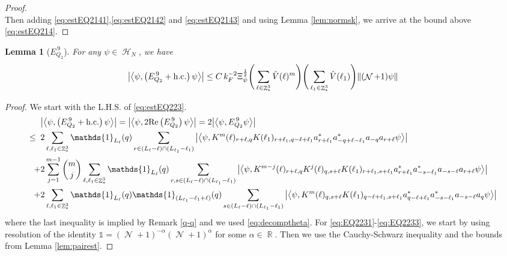 \documentclass[sn-mathphys, Numbered ,a4paper]{sn-jnl}%
\DeclareMathOperator{\R}{\mathbb{R}}
\DeclareMathOperator{\Z}{\mathbb{Z}}
\DeclareMathOperator{\HH}{\mathcal{H}}
\DeclareMathOperator{\NN}{\mathcal{N}}
\newcommand{\half}{\frac{1}{2}}
\newcommand{\eva}[1]{\left\langle #1 \right\rangle}
\theoremstyle{plain}
\newtheorem{lemma}[theorem]{Lemma}
\theoremstyle{definition}
\theoremstyle{remark}
\theoremstyle{plain}
\theoremstyle{definition}
\theoremstyle{remark}
\begin{document}
{\begin{proof}
\begin{equation}
		\end{equation}
		Then adding \eqref{eq:estEQ2141},\eqref{eq:estEQ2142} and \eqref{eq:estEQ2143} and using Lemma \ref{lem:normsk}, we arrive at the bound above \eqref{eq:estEQ214}.
	\end{proof}
	\begin{lemma}[$E_{Q_2}^{\,9}$]\label{lem:EQ223}
		For any $\psi \in \HH_N$, we have
		\begin{align}
			\abs{\eva{\psi,\left(E^{\,9}_{Q_2}+\mathrm{h.c.}\right) \psi }}
			\leq  C\, k_{F}^{-2} \Xi_{\psi}^{\half} \Bigg(\sum\limits_{\ell \in \Z^3_*} \hat{V}(\ell)^m \Bigg) \Bigg( \sum\limits_{\ell_1 \in \Z^3_*}\hat{V}(\ell_1) \Bigg)  \norm { (\NN+1) \psi } \label{eq:estEQ223}
		\end{align}
	\end{lemma}
	\begin{proof}
		We start with the L.H.S. of \eqref{eq:estEQ223}.
		\begin{align}
			&\abs{\eva{\psi,\left(E^{\,9}_{Q_2}+\mathrm{h.c.}\right) \psi }} = \abs{\eva{\psi,2\mathrm{Re}\left(E^{\,9}_{Q_2}\right) \psi }} = 2\abs{\eva{\psi, E^{\,9}_{Q_2} \psi }}\nonumber\\
			\leq\;\;&2 \sum\limits_{\ell, \ell_1\in \Z^3_*} \mathds{1}_{L_{\ell}}(q) \sum\limits_{r \in (L_{\ell}-\ell) \cap (L_{\ell_1}-\ell_1)} \abs{\eva{\psi, K^m(\ell)_{r+\ell,q} K(\ell_1)_{r+\ell_1,q-\ell+\ell_1}  a^*_{r+\ell_1}a^*_{-q+\ell-\ell_1}a_{-q}a_{r+\ell} \psi}} \label{eq:EQ2231}\\
			\;+&2 \sum\limits_{j=1}^{m-1} {{m}\choose j} \sum\limits_{\ell, \ell_1\in \Z^3_*}\mathds{1}_{L_{\ell}}(q) \sum\limits_{r,s \in (L_{\ell}-\ell) \cap (L_{\ell_1}-\ell_1)}  \abs{\eva{\psi, K^{m-j}(\ell)_{r+\ell, q} K^{j}(\ell)_{q,s+\ell} K(\ell_1)_{r+\ell_1,s+\ell_1}  a^*_{r+\ell_1}a^*_{-s-\ell_1}a_{-s-\ell}a_{r+\ell} \psi }} \label{eq:EQ2232}\\
			\;+&2\sum\limits_{\ell, \ell_1\in \Z^3_*} \mathds{1}_{L_{\ell}}(q) \mathds{1}_{(L_{\ell_1}-\ell_1+\ell)}(q) \sum\limits_{s \in (L_{\ell}-\ell) \cap (L_{\ell_1}-\ell_1)} \abs{\eva{\psi, K^m(\ell)_{q,s+\ell} K(\ell_1)_{q-\ell+\ell_1,s+\ell_1}  a^*_{q-\ell+\ell_1}a^*_{-s-\ell_1}a_{-s-\ell}a_{q} \psi}} \label{eq:EQ2233}
		\end{align}
		where the last inequality is implied by Remark \ref{q-q} and we used \eqref{eq:decomptheta}.
		For \eqref{eq:EQ2231}-\eqref{eq:EQ2233}, we start by using resolution of the identity $\mathds{1} = (\NN+1)^{-\alpha}(\NN+1)^{\alpha}$ for some $\alpha \in \R$. Then we use the Cauchy-Schwarz inequality and the bounds from Lemma \ref{lem:pairest}.

\end{proof}}
\end{document}
